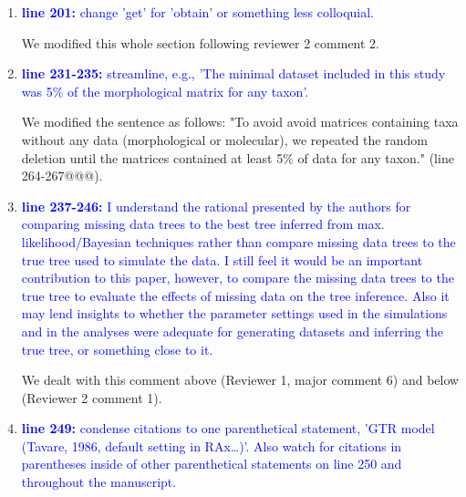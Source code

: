 \documentclass[12pt,letterpaper]{article}
\begin{document}
\begin{enumerate}

\item{\textcolor{blue}{\textbf{line 201:} change 'get' for 'obtain' or something less colloquial.}}

We modified this whole section following reviewer 2 comment 2.

\item{\textcolor{blue}{\textbf{line 231-235:} streamline, e.g., 'The minimal dataset included in this study was 5\% of the morphological matrix for any taxon'.}}

We modified the sentence as follows: "To avoid avoid matrices containing taxa without any data (morphological or molecular), we repeated the random deletion until the matrices contained at least 5\% of data for any taxon." (line 264-267@@@).

\item{\textcolor{blue}{\textbf{line 237-246:} I understand the rational presented by the authors for comparing missing data trees to the best tree inferred from max. likelihood/Bayesian techniques rather than compare missing data trees to the true tree used to simulate the data. I still feel it would be an important contribution to this paper, however, to compare the missing data trees to the true tree to evaluate the effects of missing data on the tree inference. Also it may lend insights to whether the parameter settings used in the simulations and in the analyses were adequate for generating datasets and inferring the true tree, or something close to it. }}

We dealt with this comment above (Reviewer 1, major comment 6) and below (Reviewer 2 comment 1).

\item{\textcolor{blue}{\textbf{line 249:} condense citations to one parenthetical statement, 'GTR model (Tavare, 1986, default setting in RAx…)'. Also watch for citations in parentheses inside of other parenthetical statements on line 250 and throughout the manuscript. }}


\end{enumerate}
\end{document}
